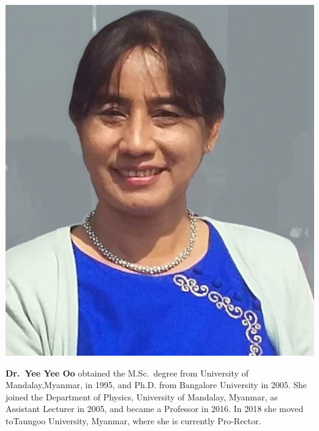 \centerline{\includegraphics[scale=.8]{authorsphotos/YeeYeeOo1.jpg}}
\medskip

\noindent
{\biofntsize\textbf{Dr.\ Yee Yee Oo} obtained the M.Sc.\ degree from University of Mandalay,\break Myanmar, in 1995, and Ph.D. from Bangalore University in 2005. She joined the Department of Physics, University of Mandalay, Myanmar, as Assistant Lecturer in 2005, and became a Professor in 2016. In 2018 she moved to\break Taungoo University, Myanmar, where she is currently Pro-Rector.}
